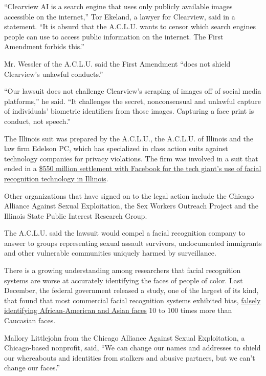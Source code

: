 ``Clearview AI is a search engine that uses only publicly available
images accessible on the internet,'' Tor Ekeland, a lawyer for
Clearview, said in a statement. ``It is absurd that the A.C.L.U. wants
to censor which search engines people can use to access public
information on the internet. The First Amendment forbids this.''

Mr. Wessler of the A.C.L.U. said the First Amendment ``does not shield
Clearview's unlawful conducts.''

``Our lawsuit does not challenge Clearview's scraping of images off of
social media platforms,'' he said. ``It challenges the secret,
nonconsensual and unlawful capture of individuals' biometric identifiers
from those images. Capturing a face print is conduct, not speech.''

The Illinois suit was prepared by the A.C.L.U., the A.C.L.U. of Illinois
and the law firm Edelson PC, which has specialized in class action suits
against technology companies for privacy violations. The firm was
involved in a suit that ended in a
\href{https://www.nytimes3xbfgragh.onion/2020/01/29/technology/facebook-privacy-lawsuit-earnings.html}{\$550
million settlement with Facebook for the tech giant's use of facial
recognition technology in Illinois}.

Other organizations that have signed on to the legal action include the
Chicago Alliance Against Sexual Exploitation, the Sex Workers Outreach
Project and the Illinois State Public Interest Research Group.

The A.C.L.U. said the lawsuit would compel a facial recognition company
to answer to groups representing sexual assault survivors, undocumented
immigrants and other vulnerable communities uniquely harmed by
surveillance.

There is a growing understanding among researchers that facial
recognition systems are worse at accurately identifying the faces of
people of color. Last December, the federal government released a study,
one of the largest of its kind, that found that most commercial facial
recognition systems exhibited bias,
\href{https://www.nytimes3xbfgragh.onion/2019/07/08/us/detroit-facial-recognition-cameras.htmlhttps://www.nytimes3xbfgragh.onion/2019/12/19/technology/facial-recognition-bias.html}{falsely
identifying African-American and Asian faces} 10 to 100 times more than
Caucasian faces.

Mallory Littlejohn from the Chicago Alliance Against Sexual
Exploitation, a Chicago-based nonprofit, said, ``We can change our names
and addresses to shield our whereabouts and identities from stalkers and
abusive partners, but we can't change our faces.''

